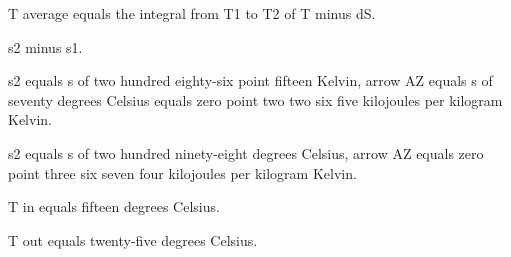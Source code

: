 T average equals the integral from T1 to T2 of T minus dS. 

s2 minus s1. 

s2 equals s of two hundred eighty-six point fifteen Kelvin, arrow AZ equals s of seventy degrees Celsius equals zero point two two six five kilojoules per kilogram Kelvin. 

s2 equals s of two hundred ninety-eight degrees Celsius, arrow AZ equals zero point three six seven four kilojoules per kilogram Kelvin. 

T in equals fifteen degrees Celsius. 

T out equals twenty-five degrees Celsius.